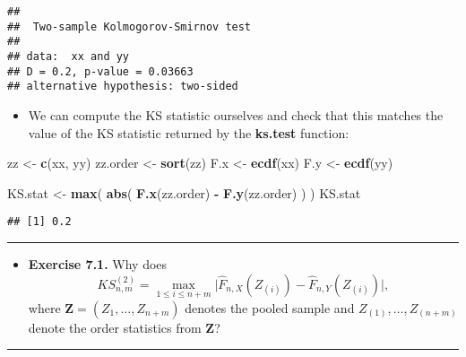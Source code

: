 \documentclass[]{book}
\newenvironment{Shaded}{\begin{snugshade}}{\end{snugshade}}
\newcommand{\KeywordTok}[1]{\textcolor[rgb]{0.13,0.29,0.53}{\textbf{#1}}}
\newcommand{\NormalTok}[1]{#1}
\newcommand{\OperatorTok}[1]{\textcolor[rgb]{0.81,0.36,0.00}{\textbf{#1}}}
\newcommand{\StringTok}[1]{\textcolor[rgb]{0.31,0.60,0.02}{#1}}
\providecommand{\tightlist}{%
  \setlength{\itemsep}{0pt}\setlength{\parskip}{0pt}}
\begin{document}
\begin{verbatim}
## 
##  Two-sample Kolmogorov-Smirnov test
## 
## data:  xx and yy
## D = 0.2, p-value = 0.03663
## alternative hypothesis: two-sided
\end{verbatim}

\begin{itemize}
\tightlist
\item
  We can compute the KS statistic ourselves and check that this matches the value of the KS statistic
  returned by the \textbf{ks.test} function:
\end{itemize}

\begin{Shaded}
\begin{Highlighting}[]
\NormalTok{zz <-}\StringTok{ }\KeywordTok{c}\NormalTok{(xx, yy)}
\NormalTok{zz.order <-}\StringTok{ }\KeywordTok{sort}\NormalTok{(zz)}
\NormalTok{F.x <-}\StringTok{ }\KeywordTok{ecdf}\NormalTok{(xx)}
\NormalTok{F.y <-}\StringTok{ }\KeywordTok{ecdf}\NormalTok{(yy)}

\NormalTok{KS.stat <-}\StringTok{ }\KeywordTok{max}\NormalTok{( }\KeywordTok{abs}\NormalTok{( }\KeywordTok{F.x}\NormalTok{(zz.order) }\OperatorTok{-}\StringTok{ }\KeywordTok{F.y}\NormalTok{(zz.order) ) )}
\NormalTok{KS.stat}
\end{Highlighting}
\end{Shaded}

\begin{verbatim}
## [1] 0.2
\end{verbatim}

\begin{center}\rule{0.5\linewidth}{\linethickness}\end{center}

\begin{itemize}
\tightlist
\item
  \textbf{Exercise 7.1.} Why does
  \begin{equation}
  KS_{n,m}^{(2)} = \max_{1 \leq i \leq n+m} \big| \hat{F}_{n,X}(Z_{(i)}) -  \hat{F}_{n,Y}(Z_{(i)}) \big|, \nonumber
  \end{equation}
  where \(\mathbf{Z} = (Z_{1}, \ldots, Z_{n+m})\) denotes the pooled sample and \(Z_{(1)}, \ldots, Z_{(n+m)}\)
  denote the order statistics from \(\mathbf{Z}\)?
\end{itemize}

\begin{center}\rule{0.5\linewidth}{\linethickness}\end{center}
\end{document}
